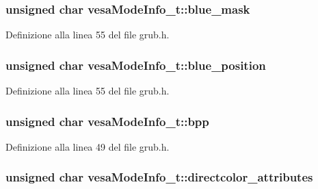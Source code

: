 \hypertarget{structvesaModeInfo__t_aff78588c9039e0f8985d08bc2c5dd5ae}{
\subsubsection[{blue\+\_\+mask}]{\setlength{\rightskip}{0pt plus 5cm}unsigned char vesa\+Mode\+Info\+\_\+t\+::blue\+\_\+mask}}\label{structvesaModeInfo__t_aff78588c9039e0f8985d08bc2c5dd5ae}


Definizione alla linea 55 del file grub.\+h.

\hypertarget{structvesaModeInfo__t_a20289f01bea4e5cbb2533e3c97f8d308}{
\subsubsection[{blue\+\_\+position}]{\setlength{\rightskip}{0pt plus 5cm}unsigned char vesa\+Mode\+Info\+\_\+t\+::blue\+\_\+position}}\label{structvesaModeInfo__t_a20289f01bea4e5cbb2533e3c97f8d308}


Definizione alla linea 55 del file grub.\+h.

\hypertarget{structvesaModeInfo__t_acbf51c6b217de951bd6b40ae60b2343d}{
\subsubsection[{bpp}]{\setlength{\rightskip}{0pt plus 5cm}unsigned char vesa\+Mode\+Info\+\_\+t\+::bpp}}\label{structvesaModeInfo__t_acbf51c6b217de951bd6b40ae60b2343d}


Definizione alla linea 49 del file grub.\+h.

\hypertarget{structvesaModeInfo__t_afb95209f1e3ffa74635cb68495ecec26}{
\subsubsection[{directcolor\+\_\+attributes}]{\setlength{\rightskip}{0pt plus 5cm}unsigned char vesa\+Mode\+Info\+\_\+t\+::directcolor\+\_\+attributes}}\label{structvesaModeInfo__t_afb95209f1e3ffa74635cb68495ecec26}


